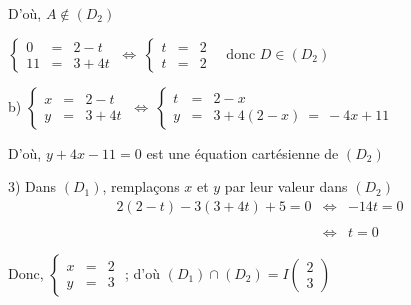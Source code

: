 \documentclass[12pt]{article}
\begin{document}
D'où, $A\notin(D_{2})$

$\left\lbrace\begin{array}{rcl} 0&=&2-t \\ 11&=&3+4t\end{array}\right.\ \Leftrightarrow\ \left\lbrace\begin{array}{rcl} t&=&2 \\ t&=&2\end{array}\right.\quad\text{donc }D\in(D_{2})$

b) $\left\lbrace\begin{array}{rcl} x&=&2-t \\ y&=&3+4t\end{array}\right.\ \Leftrightarrow\ \left\lbrace\begin{array}{rcl} t&=&2-x \\ y&=&3+4(2-x)\ =\ -4x+11\end{array}\right.$

D'où, $y+4x-11=0$ est une équation cartésienne de $(D_{2})$

3) Dans $(D_{1})$, remplaçons $x$ et $y$ par leur valeur dans $(D_{2})$
	$$\begin{array}{rcl} 2(2-t)-3(3+4t)+5=0&\Leftrightarrow&-14t=0\\\\&\Leftrightarrow&t=0\end{array}$$
	
Donc, $\left\lbrace\begin{array}{rcl} x&=&2 \\ y&=&3\end{array}\right.$ ; d'où $(D_{1})\cap(D_{2})=I\begin{pmatrix} 2 \\ 3\end{pmatrix}$
\end{document}
